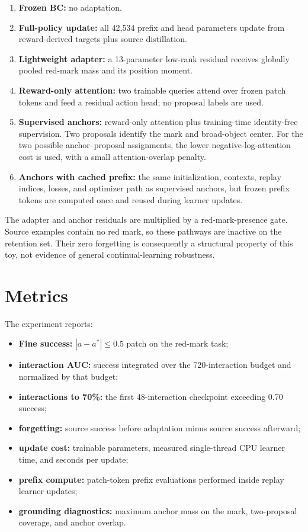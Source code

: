 \documentclass[11pt]{article}
\begin{document}
\begin{enumerate}[leftmargin=1.5em]
  \item \textbf{Frozen BC:} no adaptation.
  \item \textbf{Full-policy update:} all 42,534 prefix and head parameters update from reward-derived targets plus source distillation.
  \item \textbf{Lightweight adapter:} a 13-parameter low-rank residual receives globally pooled red-mark mass and its position moment.
  \item \textbf{Reward-only attention:} two trainable queries attend over frozen patch tokens and feed a residual action head; no proposal labels are used.
  \item \textbf{Supervised anchors:} reward-only attention plus training-time identity-free supervision. Two proposals identify the mark and broad-object center. For the two possible anchor--proposal assignments, the lower negative-log-attention cost is used, with a small attention-overlap penalty.
  \item \textbf{Anchors with cached prefix:} the same initialization, contexts, replay indices, losses, and optimizer path as supervised anchors, but frozen prefix tokens are computed once and reused during learner updates.
\end{enumerate}

The adapter and anchor residuals are multiplied by a red-mark-presence gate. Source examples contain no red mark, so these pathways are inactive on the retention set. Their zero forgetting is consequently a structural property of this toy, not evidence of general continual-learning robustness.

\section{Metrics}

The experiment reports:
\begin{itemize}[leftmargin=1.5em]
  \item \textbf{Fine success:} $|a-a^*|\leq0.5$ patch on the red-mark task;
  \item \textbf{interaction AUC:} success integrated over the 720-interaction budget and normalized by that budget;
  \item \textbf{interactions to 70\%:} the first 48-interaction checkpoint exceeding 0.70 success;
  \item \textbf{forgetting:} source success before adaptation minus source success afterward;
  \item \textbf{update cost:} trainable parameters, measured single-thread CPU learner time, and seconds per update;
  \item \textbf{prefix compute:} patch-token prefix evaluations performed inside replay learner updates;
  \item \textbf{grounding diagnostics:} maximum anchor mass on the mark, two-proposal coverage, and anchor overlap.
\end{itemize}
\end{document}
